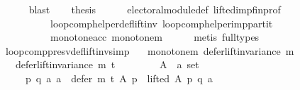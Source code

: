 \begin{isabellebody}
\ \ \ \ \isamarkupfalse%
\ blast\isanewline
\ \ \isamarkupfalse%
\ {\isacharquery}{\kern0pt}thesis\isanewline
\ \ \ \ \isamarkupfalse%
\ electoral{\isacharunderscore}{\kern0pt}module{\isacharunderscore}{\kern0pt}def\ lifted{\isacharunderscore}{\kern0pt}imp{\isacharunderscore}{\kern0pt}fin{\isacharunderscore}{\kern0pt}prof\isanewline
\ \ \ \ \ \ \ \ \ \ loop{\isacharunderscore}{\kern0pt}comp{\isacharunderscore}{\kern0pt}helper{\isacharunderscore}{\kern0pt}def{\isacharunderscore}{\kern0pt}lift{\isacharunderscore}{\kern0pt}inv\ loop{\isacharunderscore}{\kern0pt}comp{\isacharunderscore}{\kern0pt}helper{\isacharunderscore}{\kern0pt}imp{\isacharunderscore}{\kern0pt}partit\isanewline
\ \ \ \ \ \ \ \ \ \ monotone{\isacharunderscore}{\kern0pt}acc\ monotone{\isacharunderscore}{\kern0pt}m\isanewline
\ \ \ \ \isamarkupfalse%
\ {\isacharparenleft}{\kern0pt}metis\ {\isacharparenleft}{\kern0pt}full{\isacharunderscore}{\kern0pt}types{\isacharparenright}{\kern0pt}{\isacharparenright}{\kern0pt}\isanewline
{}\isamarkupfalse%
%
\endisatagproof
{\isafoldproof}%
%
\isadelimproof
\isanewline
%
\endisadelimproof
\isanewline
\isanewline
{}\isamarkupfalse%
\ loop{\isacharunderscore}{\kern0pt}comp{\isacharunderscore}{\kern0pt}presv{\isacharunderscore}{\kern0pt}def{\isacharunderscore}{\kern0pt}lift{\isacharunderscore}{\kern0pt}inv{\isacharbrackleft}{\kern0pt}simp{\isacharbrackright}{\kern0pt}{\isacharcolon}{\kern0pt}\isanewline
\ \ \ monotone{\isacharunderscore}{\kern0pt}m{\isacharcolon}{\kern0pt}\ {\isachardoublequoteopen}defer{\isacharunderscore}{\kern0pt}lift{\isacharunderscore}{\kern0pt}invariance\ m{\isachardoublequoteclose}\isanewline
\ \ \ {\isachardoublequoteopen}defer{\isacharunderscore}{\kern0pt}lift{\isacharunderscore}{\kern0pt}invariance\ {\isacharparenleft}{\kern0pt}m\ {\isasymcirclearrowleft}\isactrlsub t{\isacharparenright}{\kern0pt}{\isachardoublequoteclose}\isanewline
%
\isadelimproof
%
\endisadelimproof
%
\isatagproof
{}\isamarkupfalse%
\ {\isacharminus}{\kern0pt}\isanewline
\ \ \isamarkupfalse%
\isanewline
\ \ \ \ A\ {\isacharcolon}{\kern0pt}{\isacharcolon}{\kern0pt}\ {\isachardoublequoteopen}{\isacharprime}{\kern0pt}a\ set{\isachardoublequoteclose}\isanewline
\ \ \isamarkupfalse%
\isanewline
\ \ \ \ {\isachardoublequoteopen}{\isasymforall}\ p\ q\ a{\isachardot}{\kern0pt}\ {\isacharparenleft}{\kern0pt}a\ {\isasymin}\ {\isacharparenleft}{\kern0pt}defer\ {\isacharparenleft}{\kern0pt}m\ {\isasymcirclearrowleft}\isactrlsub t{\isacharparenright}{\kern0pt}\ A\ p{\isacharparenright}{\kern0pt}\ {\isasymand}\ lifted\ A\ p\ q\ a{\isacharparenright}{\kern0pt}\ {\isasymlongrightarrow}\isanewline

\end{isabellebody}
